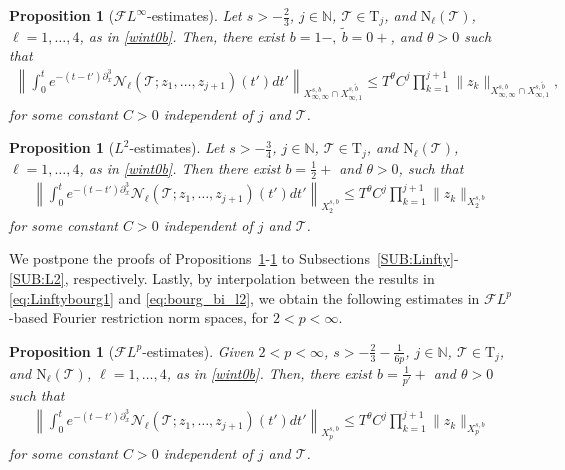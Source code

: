 \documentclass[%
11pt,  reqno]{amsart}
\newcommand{\5}{\textup{V}}
\newcommand{\FL}{\mathcal{F} L}
\newcommand{\wt}{\widetilde}
\newcommand{\dx}{\partial_x}
\newtheorem{proposition}[theorem]{Proposition}
\theoremstyle{remark}
\newcommand{\TT}{\mathcal{T}}
\newcommand{\Tr}{\mathrm{T}}
\newcommand{\bfrak}{\mathfrak{b}}
\newcommand{\gfrak}{\mathfrak{g}}
\newcommand{\ta}{\theta}
\renewcommand{\l}{\ell}
\newcommand{\N}{\mathbb{N}}
\numberwithin{equation}{section}
\numberwithin{theorem}{section}
\newcommand{\NN}{\mathrm{N}}
\newcommand{\Ncal}{\mathcal{N}}
\begin{document}
\begin{proposition}[$\FL^\infty$-estimates]\label{prop:bourgLinfty}
Let $s>-\frac23$, $j \in\N$, $\TT \in \Tr_j$, and $\NN_\l(\TT)$, $\l=1,\dots, 4$, as in \eqref{wint0b}. Then, there exist 
$b=1-,\ \tilde{b}=0+$, and $\ta>0$ such that
	\begin{align}
		\left\| \int_0^t e^{-(t-t')\dx^3}\Ncal_\l(\TT; z_1,\dots, z_{j+1})(t')dt'\right\|_{X^{s,b}_{\infty, \infty}\cap X^{s,\wt b}_{\infty, 1}} \le T^\ta C^j\prod_{k=1}^{j+1}\|z_k\|_{X^{s,b}_{\infty, \infty}\cap X^{s,\tilde{b}}_{\infty,1}}, \label{eq:Linftybourg1} 
	\end{align}
for some constant $C>0$ independent of $j$ and $\TT$. 
\end{proposition}



\begin{proposition}[$L^2$-estimates]\label{prop:bourgL2}
Let $s>-\frac34$, $j \in\N$, $\TT \in \Tr_j$, and $\NN_\l(\TT)$, $\l=1,\dots,4$, as in \eqref{wint0b}.
	Then there exist $b=\frac12+$ and $\ta>0$, such that
	\begin{align}\label{eq:bourg_bi_l2}
		\left\|\int_0^t e^{-(t-t')\dx^3} \Ncal_\l(\TT; z_1,\dots, z_{j+1})(t') dt'  \right\|_{X^{s,b}_{2}}  \le T^\ta C^j\prod_{k=1}^{j+1}\|z_k\|_{X^{s,b}_{2}}
	\end{align}
    for some constant $C>0$ independent of $j$ and $\TT$.
\end{proposition}


We postpone the proofs of Propositions~\ref{prop:bourgLinfty}-\ref{prop:bourgLinfty} to Subsections~\ref{SUB:Linfty}-\ref{SUB:L2}, respectively. Lastly, by interpolation between the results in \eqref{eq:Linftybourg1} and \eqref{eq:bourg_bi_l2}, we obtain the following estimates in $\FL^p$-based Fourier restriction norm spaces, for $2 < p <\infty$. 


\begin{proposition}[$\FL^p$-estimates]\label{prop:bourgLp}
Given $2 < p <\infty$, $s>-\frac{2}{3}-\frac{1}{6p}$, $j\in\N$,  $\TT\in \Tr_{j}$, and $\NN_\l(\TT)$, $\l=1,\dots, 4$, as in \eqref{wint0b}. Then,
there exist $b=\frac{1}{p'}+$ and $\ta>0$ such that
	\begin{align}\label{eq:bourg_bi_lp}
		\left\|\int_0^t e^{-(t-t')\dx^3} \Ncal_\l(\TT; z_1,\dots, z_{j+1})(t') dt'  \right\|_{X^{s,b}_{p}} 
        \le T^\ta C^j\prod_{k=1}^{j+1}\|z_k\|_{X^{s,b}_{p}}
	\end{align}
    for some constant $C>0$ independent of $j$ and $\TT$.
\end{proposition}
\end{document}
